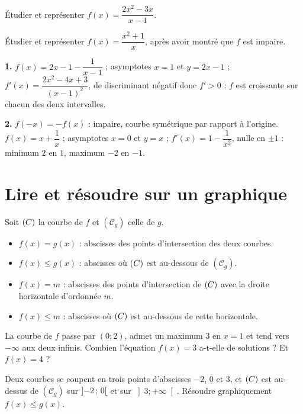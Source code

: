 \begin{entrainement}
\exo[\niveau{2}] Étudier et représenter $f(x) = \dfrac{2x^{2}-3x}{x-1}$.

\exo[\niveau{2}] Étudier et représenter $f(x) = \dfrac{x^{2}+1}{x}$, après
avoir montré que $f$ est impaire.
\end{entrainement}

\begin{corrige}
\textbf{1.} $f(x) = 2x-1-\dfrac{1}{x-1}$ ; asymptotes $x=1$ et $y=2x-1$ ;
$f'(x) = \dfrac{2x^{2}-4x+3}{(x-1)^{2}}$, de discriminant négatif donc $f'>0$ :
$f$ est croissante sur chacun des deux intervalles.

\textbf{2.} $f(-x) = -f(x)$ : impaire, courbe symétrique par rapport à
l'origine. $f(x) = x+\dfrac{1}{x}$ ; asymptotes $x=0$ et $y=x$ ;
$f'(x) = 1-\dfrac{1}{x^{2}}$, nulle en $\pm1$ : minimum $2$ en $1$, maximum
$-2$ en $-1$.
\end{corrige}

\section{Lire et résoudre sur un graphique}

\begin{propriete}
Soit $(C)$ la courbe de $f$ et $(\mathscr{C}_{g})$ celle de $g$.
\begin{itemize}[leftmargin=1.4em, itemsep=0.22em]
  \item $f(x) = g(x)$ : abscisses des points d'intersection des deux courbes.
  \item $f(x) \leq g(x)$ : abscisses où $(C)$ est au-dessous de $(\mathscr{C}_{g})$.
  \item $f(x) = m$ : abscisses des points d'intersection de $(C)$ avec la
        droite horizontale d'ordonnée $m$.
  \item $f(x) \leq m$ : abscisses où $(C)$ est au-dessous de cette
        horizontale.
\end{itemize}
\end{propriete}

\begin{entrainement}
\exo[\niveau{1}] La courbe de $f$ passe par $(0;2)$, admet un maximum $3$ en
$x=1$ et tend vers $-\infty$ aux deux infinis. Combien l'équation
$f(x) = 3$ a-t-elle de solutions ? Et $f(x) = 4$ ?

\exo[\niveau{2}] Deux courbes se coupent en trois points d'abscisses $-2$, $0$
et $3$, et $(C)$ est au-dessus de $(\mathscr{C}_{g})$ sur
$\left]-2\,;\,0\right[$ et sur $\left]3 ; +\infty\right[$. Résoudre
graphiquement $f(x) \leq g(x)$.
\end{entrainement}

